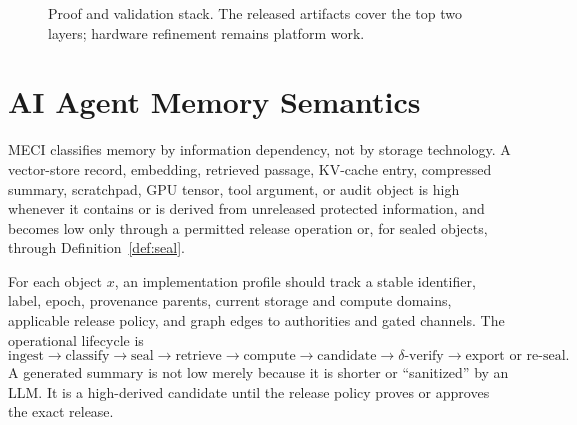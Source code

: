 \documentclass[11pt,letterpaper]{article}
\theoremstyle{plain}
\theoremstyle{definition}
\begin{document}
\begin{figure}[t]
\centering
{}
\caption{Proof and validation stack. The released artifacts cover the top two layers; hardware refinement remains platform work.}
\label{fig:stack}
\end{figure}

\section{AI Agent Memory Semantics}\label{sec:agent}

MECI classifies memory by information dependency, not by storage technology. A vector-store record, embedding, retrieved passage, KV-cache entry, compressed summary, scratchpad, GPU tensor, tool argument, or audit object is high whenever it contains or is derived from unreleased protected information, and becomes low only through a permitted release operation or, for sealed objects, through Definition~\ref{def:seal}.

For each object $x$, an implementation profile should track a stable identifier, label, epoch, provenance parents, current storage and compute domains, applicable release policy, and graph edges to authorities and gated channels. The operational lifecycle is
\begin{equation}
\text{ingest} \to \text{classify} \to \text{seal} \to \text{retrieve} \to \text{compute} \to \text{candidate} \to \delta\text{-verify} \to \text{export or re-seal}.
\end{equation}
A generated summary is not low merely because it is shorter or ``sanitized'' by an LLM. It is a high-derived candidate until the release policy proves or approves the exact release.
\end{document}
